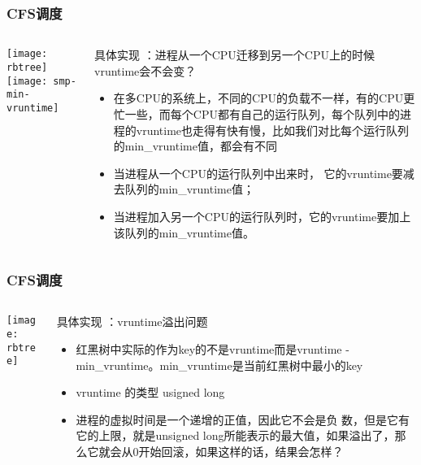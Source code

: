 \begin{frame}
	\frametitle{CFS调度}
	\begin{columns}
		\begin{column}{.4\textwidth}
			\Large \centering
			
			\texttt{[image: rbtree]}
			\texttt{[image: smp-min-vruntime]}
		\end{column}
		
		\begin{column}{.6\textwidth}
			
			具体实现 ：进程从一个CPU迁移到另一个CPU上的时候vruntime会不会变？
			\begin{itemize}
				\item 在多CPU的系统上，不同的CPU的负载不一样，有的CPU更忙一些，而每个CPU都有自己的运行队列，每个队列中的进程的vruntime也走得有快有慢，比如我们对比每个运行队列的min\_vruntime值，都会有不同
				\pause
				\item 当进程从一个CPU的运行队列中出来时， 它的vruntime要减去队列的min\_vruntime值；
				\item 当进程加入另一个CPU的运行队列时，它的vruntime要加上该队列的min\_vruntime值。
			\end{itemize}
			\centering
		\end{column}
	\end{columns}
\end{frame}


\begin{frame}
	\frametitle{CFS调度}
	\begin{columns}
		\begin{column}{.4\textwidth}
			\Large \centering
			
			\texttt{[image: rbtree]}
		\end{column}
		
		\begin{column}{.6\textwidth}
			
			具体实现 ：vruntime溢出问题
			\begin{itemize}
				\item 红黑树中实际的作为key的不是vruntime而是vruntime - min\_vruntime。min\_vruntime是当前红黑树中最小的key
				\item vruntime 的类型 usigned long
				\item 进程的虚拟时间是一个递增的正值，因此它不会是负 数，但是它有它的上限，就是unsigned long所能表示的最大值，如果溢出了，那么它就会从0开始回滚，如果这样的话，结果会怎样？
			\end{itemize}
			\centering

		\end{column}
	\end{columns}
\end{frame}


